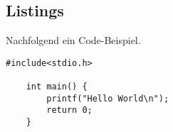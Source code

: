 \subsection{Listings}

Nachfolgend ein Code-Beispiel.

\begin{lstlisting}[caption={Hello World in C}]
	#include<stdio.h>

	int main() {
		printf("Hello World\n");
		return 0;
	}
\end{lstlisting}
	





